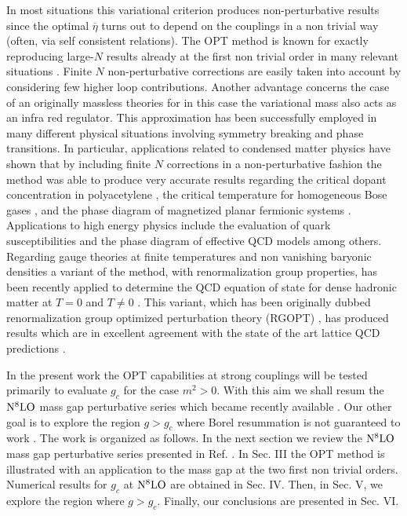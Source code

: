\documentclass[a4paper,11pt]{article}
\begin{document}
In most situations this variational criterion produces non-perturbative results since the optimal $\overline \eta$ turns out to depend on the couplings in a non trivial way (often, via self consistent relations). The OPT method is known for exactly reproducing large-$N$ results already at the first non trivial order in many relevant situations \cite{npb}. Finite $N$ non-perturbative corrections are easily taken into account by considering few higher loop contributions. Another advantage concerns the case of an originally massless theories for in this case the variational mass also acts as an infra red regulator. This approximation has been successfully employed in many different physical situations involving symmetry breaking and phase transitions. In particular, applications related to condensed matter physics have shown that by including finite $N$ corrections in a  non-perturbative fashion the method was able to produce very accurate results regarding the critical dopant concentration in polyacetylene \cite {poly},  the critical temperature for homogeneous Bose gases \cite {bec}, and the phase diagram of magnetized planar fermionic systems \cite {GNmag}. Applications to high energy physics include the evaluation of quark susceptibilities \cite{tulio} and the phase diagram of effective QCD  models \cite {2CEP} among others.  Regarding gauge theories at finite temperatures and non vanishing baryonic densities a variant of the method, with renormalization group  properties, has been recently applied to determine the QCD equation of state for  dense hadronic matter at $T=0$ \cite {coldQCD} and $T\ne 0$ \cite {letterHOT, longHOT}. This variant, which has been originally dubbed renormalization group optimized perturbation theory (RGOPT) \cite{JLGN,JLalphas}, has produced results which are in excellent agreement with the state of the art lattice QCD predictions \cite {letterHOT, longHOT}. 


In the present work the OPT capabilities at strong couplings will be tested   primarily to evaluate $g_c$ for the case $m^2 >0$. With this aim we shall resum the ${\rm N^8 LO}$ mass gap perturbative series which became recently available  \cite{serone3}.  Our other  goal is to explore the region $g>g_c$ where  Borel resummation is not guaranteed to work \cite{serone1,serone4}. The work is organized as follows. In the next section we review the  ${\rm N}^8{\rm LO}$ mass gap perturbative series  presented in Ref. \cite{serone3}. In Sec. III the OPT method is illustrated with an application to the mass gap at the two first non trivial orders. Numerical results for $g_c$ at  ${\rm N}^8{\rm LO}$ are obtained in Sec. IV. Then, in Sec. V, we explore the region where $g>g_c$.  Finally, our conclusions  are presented in Sec. VI.
\end{document}

